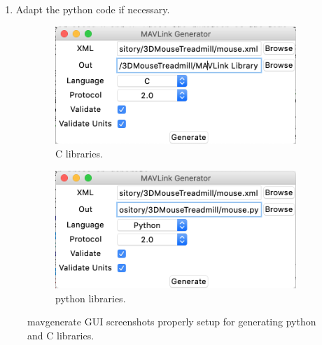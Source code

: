 \documentclass[12pt,a4paper, twoside]{article}
\begin{document}
\begin{enumerate}
\begin{enumerate}
		\begin{itemize}
			\item \textbf{XML} there you indicate the mouse.xml file that was previously modified
			\item \textbf{Out} there you indicate the 3DMouseTreadmill/mouse.py
			\item \textbf{Language} Choose Python
			\item \textbf{Protocol} Choose 2.0
			\item \textbf{Validate} Choose Yes
			\item \textbf{Validate Units} Choose Yes
		\end{itemize}
		Now you can press on generate.
		The GUI should be similar to figure \ref{fig:gen_py}.
		If some errors are shown, correct them and try again.
		\item Change directory to the parent one
		\begin{lstlisting}[style = Bashstyle]
		$ cd ../
		\end{lstlisting}
		\item repeat the installation guide (see \ref{sec:install}) from point 3. 
	\end{enumerate}
	\item Adapt the python code if necessary. 	
\end{enumerate}
\begin{figure}[H]
	\centering
	\begin{subfigure}[b]{0.4\textwidth}
		\includegraphics[width=\textwidth]{fig/gen_c}
		\caption{C libraries.}
		\label{fig:gen_c}
	\end{subfigure}
	\begin{subfigure}[b]{0.4\textwidth}
		\includegraphics[width=\textwidth]{fig/gen_py}
		\caption{python libraries.}
		\label{fig:gen_py}
	\end{subfigure}
	\caption{mavgenerate GUI screenshots properly setup for generating python and C libraries.}
\end{figure}
\end{document}
